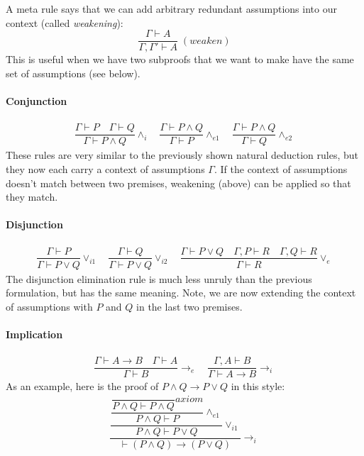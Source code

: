 \documentclass{article}
\theoremstyle{definition}
\begin{document}
A meta rule says that we can add arbitrary redundant assumptions into
our context (called \emph{weakening}):
%
\begin{equation*}
  \dfrac{\Gamma \vdash A}
        {\Gamma, \Gamma' \vdash A} \; (\textit{weaken})
  \end{equation*}
This is useful when we have two subproofs that we want to
make have the same set of assumptions (see below).

\paragraph{Conjunction}
%
\begin{align*}
\dfrac{\Gamma \vdash P \quad \Gamma \vdash Q}{\Gamma \vdash P \wedge
  Q} {\wedge_i}
\quad
\dfrac{\Gamma \vdash P \wedge Q}{\Gamma \vdash P} {\wedge_{e1}}
\quad
\dfrac{\Gamma \vdash P \wedge Q}{\Gamma \vdash Q} {\wedge_{e2}}
\end{align*}
%
These rules are very similar to the previously shown natural
deduction rules, but they now each carry a context of assumptions
$\Gamma$. If the context of assumptions doesn't match between
two premises, weakening (above) can be applied so that they match.

\paragraph{Disjunction}

\begin{align*}
\dfrac{\Gamma \vdash P}
      {\Gamma \vdash P \vee Q}  {\vee_{i1}}
\quad
\dfrac{\Gamma \vdash Q}
      {\Gamma \vdash P \vee Q} {\vee_{i2}}
\quad
\dfrac{\Gamma \vdash P \vee Q
  \quad \Gamma, P \vdash R
  \quad \Gamma, Q \vdash R}
      {\Gamma \vdash R} {\vee_{e}}
\end{align*}
%
The disjunction elimination rule is much less unruly than the previous
formulation, but has the same meaning. Note, we are now extending the
context of assumptions with $P$ and $Q$ in the last two premises.

\paragraph{Implication}

\begin{align*}
\dfrac{\Gamma \vdash A \rightarrow B \quad \Gamma \vdash A}
      {\Gamma \vdash B} {\rightarrow_e}
\quad
\dfrac{\Gamma, A \vdash B}{\Gamma \vdash A \rightarrow B}
 {\rightarrow_i}
\end{align*}
As an example, here is the proof of $P \wedge Q \rightarrow P \vee Q$
in this style:
%
\newcommand{\pAB}{\dfrac{}{P \wedge Q \vdash P \wedge Q} {\textit{axiom}}}
\begin{align*}
  \dfrac{
  \dfrac{\dfrac{\pAB}{P \wedge Q \vdash P} {\wedge_{e1}}}
  {P \wedge Q \vdash P \vee Q} {\vee_{i1}}}
  {\vdash (P \wedge Q) \rightarrow (P \vee Q)} {\rightarrow_{i}}
\end{align*}
\end{document}
